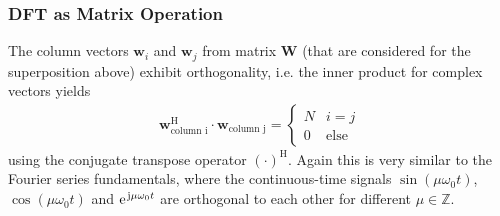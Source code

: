 \documentclass[11pt,a4paper,DIV=12]{scrartcl}
\begin{document}
\subsubsection{DFT as Matrix Operation}
\label{Ch:DFTasMatrixOperation}
%
The column vectors $\bm{w}_i$ and $\bm{w}_j$ from matrix $\bm{W}$ (that are
considered for the superposition above) exhibit orthogonality,
i.e. the inner product for complex vectors yields
\begin{align}
\bm{w}_{\text{column i}}^\text{H} \cdot \bm{w}_\text{column j} =
\begin{cases}
N & i=j\\
0 & \text{else}
\end{cases}
\end{align}
using the conjugate transpose operator $(\cdot)^\text{H}$.
%
Again this is very similar to the Fourier series fundamentals, where the
continuous-time signals
$\sin(\mu \omega_0 t)$, $\cos(\mu \omega_0 t)$ and $\e^{\im \mu \omega_0 t}$
are orthogonal to each other for different $\mu\in\mathbb{Z}$.
%
\end{document}
